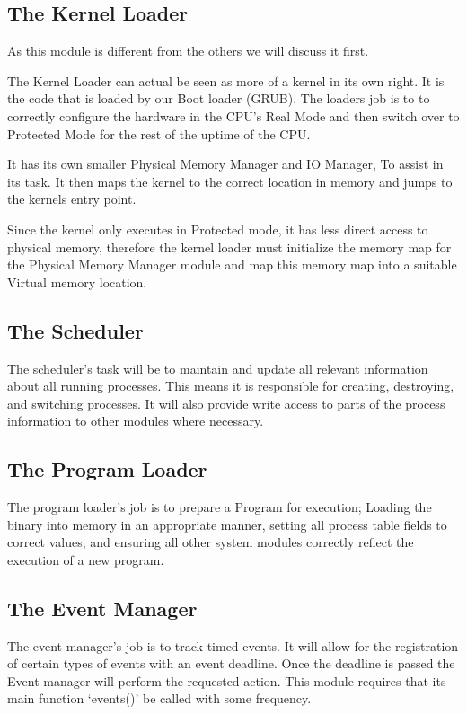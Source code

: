 \documentclass[a4paper]{report}
\begin{document}
\subsection{The Kernel Loader}

As this module is different from the others we will discuss it first.

The Kernel Loader can actual be seen as more of a kernel in its own right. It is the code that is loaded by our Boot loader (GRUB). The loaders job is to to correctly configure the hardware in the CPU's Real Mode and then switch over to Protected Mode for the rest of the uptime of the CPU.

It has its own smaller Physical Memory Manager and IO Manager, To assist in its task. It then maps the kernel to the correct location in memory and jumps to the kernels entry point.

Since the kernel only executes in Protected mode, it has less direct access to physical memory, therefore the kernel loader must initialize the memory map for the Physical Memory Manager module and map this memory map into a suitable Virtual memory location.

\subsection{The Scheduler}

The scheduler's task will be to maintain and update all relevant information about all running processes. This means it is responsible for creating, destroying, and switching processes. It will also provide write access to parts of the process information to other modules where necessary.

\subsection{The Program Loader}

The program loader's job is to prepare a Program for execution; Loading the binary into memory in an appropriate manner, setting all process table fields to correct values, and ensuring all other system modules correctly reflect the execution of a new program.

\subsection{The Event Manager}

The event manager's job is to track timed events. It will allow for the registration of certain types of events with an event deadline. Once the deadline is passed the Event manager will perform the requested action. This module requires that its main function `events()' be called with some frequency.
\end{document}
